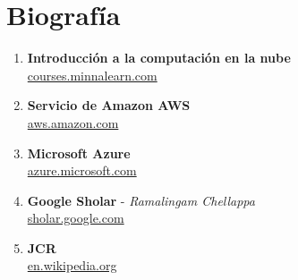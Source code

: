 \documentclass[12pt]{article}
\begin{document}
\newpage
\section{ Biografía }
\vspace{1cm}

\begin{enumerate}
  \item \textbf{Introducción a la computación en la nube}\\
    \href{https://courses.minnalearn.com/es/courses/digital-revolution/the-cloud-computing-revolution/introduction-to-cloud-computing/}{courses.minnalearn.com}

  \item \textbf{Servicio de Amazon AWS}\\
    \href{https://aws.amazon.com/es/}{aws.amazon.com}

  \item \textbf{Microsoft Azure}\\
    \href{https://azure.microsoft.com/en-us/pricing/purchase-options/pay-as-you-go/}{azure.microsoft.com}

  \item \textbf{Google Sholar} - \textit{Ramalingam Chellappa}\\
    \href{https://scholar.google.com/citations?user=L60tuywAAAAJ&hl=en}{sholar.google.com}

  \item \textbf{JCR}\\
    \href{https://en.wikipedia.org/wiki/J._C._R._Licklider}{en.wikipedia.org}

\end{enumerate}
\end{document}

